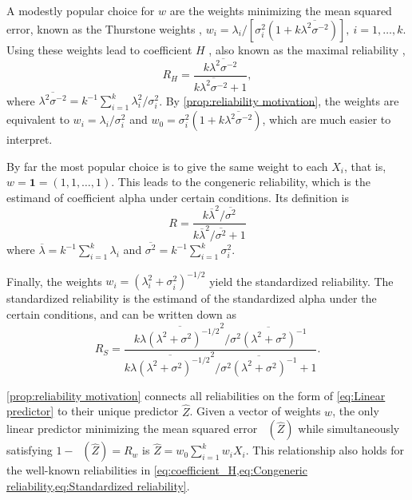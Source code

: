 \documentclass[twoside]{article}
\DeclareMathOperator{\MSE}{MSE_Z}
\begin{document}
A modestly popular choice for $w$ are the weights minimizing the mean squared error, known as the Thurstone weights \citep{thurshronebook}, $w_{i}=\lambda_{i}/[\sigma_{i}^{2}(1+k\overline{\lambda^{2}\sigma^{-2}})],\:i=1,\ldots,k$. Using these weights lead to coefficient $H$ \citep{hancock2001rethinking}, also known as the maximal reliability \citep{Li1997-yh}, 
\begin{equation}
\label{eq:coefficient_H}
 R_{H}=\frac{k\overline{\lambda^{2}\sigma^{-2}}}{k\overline{\lambda^{2}\sigma^{-2}}+1},
\end{equation}
where $\overline{\lambda^{2}\sigma^{-2}} = k^{-1}\sum_{i=1}^{k}\lambda_{i}^2/\sigma_i^2$. By \cref{prop:reliability motivation}, the weights are equivalent to $w_i = \lambda_i/\sigma_i^2$ and $w_0 = \sigma_{i}^{2}(1+k\overline{\lambda^{2}\sigma^{-2}})$, which are much easier to interpret.

By far the most popular choice is to give the same weight to each $X_i$, that is, $w = \boldsymbol{1}=(1,1,\ldots,1)$. This leads to the congeneric reliability, which is the estimand of coefficient alpha under certain conditions. Its definition is
\begin{equation}
 R =\frac{k\overline{\lambda}^{2}/\overline{\sigma^{2}}}{k\overline{\lambda}^{2}/\overline{\sigma^{2}} + 1}\label{eq:Congeneric reliability}
\end{equation}
where $\overline{\lambda}=k^{-1}\sum_{i=1}^{k}\lambda_{i}$ and
$\overline{\sigma^{2}}=k^{-1}\sum_{i=1}^{k}\sigma_{i}^{2}$. 

Finally, the weights $w_i = (\lambda_i^2 + \sigma_i^2)^{-1/2}$ yield the standardized reliability. The standardized reliability is the estimand of the standardized alpha under the certain conditions, and can be written down as
\begin{equation}
 R_S=\frac{k\overline{\lambda(\lambda^{2}+\sigma^{2})^{-1/2}}^{2}/\overline{\sigma^{2}(\lambda^{2}+\sigma^{2})^{-1}}}{k\overline{\lambda(\lambda^{2}+\sigma^{2})^{-1/2}}^{2}/\overline{\sigma^{2}(\lambda^{2}+\sigma^{2})^{-1}}+1}.\label{eq:Standardized reliability}
\end{equation}

\cref{prop:reliability motivation} connects all reliabilities on the form of \cref{eq:Linear predictor} to their unique predictor $\hat{Z}$. Given a vector of weights $w$, the only linear predictor minimizing the mean squared error $\MSE(\hat{Z})$ while simultaneously satisfying $1-\MSE(\hat{Z})=R_w$ is $\hat{Z}=w_0\sum_{i=1}^k w_iX_i$. This relationship also holds for the well-known reliabilities in \cref{eq:coefficient_H,eq:Congeneric reliability,eq:Standardized reliability}.
\end{document}
